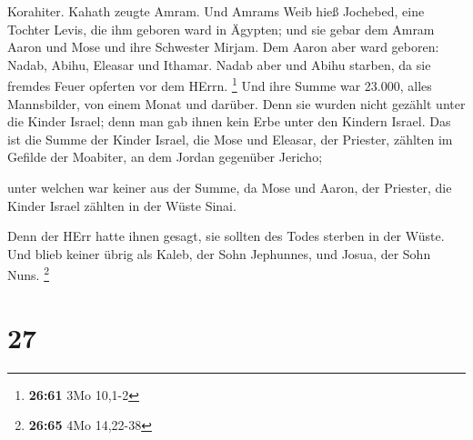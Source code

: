Korahiter. Kahath zeugte Amram.  Und Amrams Weib hieß
Jochebed, eine Tochter Levis, die ihm geboren ward in Ägypten; und sie
gebar dem Amram Aaron und Mose und ihre Schwester Mirjam. 
Dem Aaron aber ward geboren: Nadab, Abihu, Eleasar und Ithamar.
 Nadab aber und Abihu starben, da sie fremdes Feuer
opferten vor dem HErrn. \footnote{\textbf{26:61} 3Mo 10,1-2}
 Und ihre Summe war 23.000, alles Mannsbilder, von einem
Monat und darüber. Denn sie wurden nicht gezählt unter die Kinder
Israel; denn man gab ihnen kein Erbe unter den Kindern Israel.
 Das ist die Summe der Kinder Israel, die Mose und Eleasar,
der Priester, zählten im Gefilde der Moabiter, an dem Jordan gegenüber
Jericho;

 unter welchen war keiner aus der Summe, da Mose und Aaron,
der Priester, die Kinder Israel zählten in der Wüste Sinai.

 Denn der HErr hatte ihnen gesagt, sie sollten des Todes
sterben in der Wüste. Und blieb keiner übrig als Kaleb, der Sohn
Jephunnes, und Josua, der Sohn Nuns. \footnote{\textbf{26:65} 4Mo
  14,22-38}

\hypertarget{section-5}{%
\section{27}\label{section-5}}

